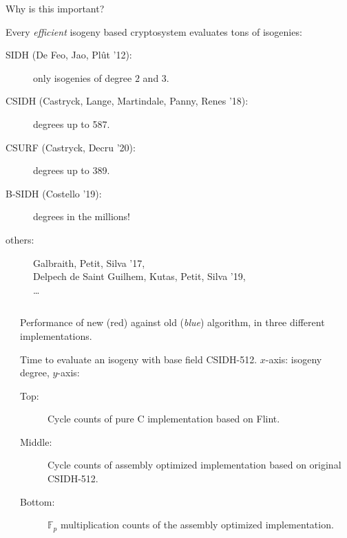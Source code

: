\documentclass[aspectratio=169]{beamer}
\newcommand{\F}{\mathbb{F}}
\begin{document}

\begin{frame}{Why is this important?}
  \large
  
  Every \emph{efficient} isogeny based cryptosystem evaluates tons of
  isogenies:

  \bigskip
  
  \begin{description}
  \item[SIDH (De Feo, Jao, Plût '12):] only isogenies of degree $2$ and $3$.\hfill{}
  \item[CSIDH (Castryck, Lange, Martindale, Panny, Renes '18):] degrees up to 587.\hfill{}
  \item[CSURF (Castryck, Decru '20):] degrees up to 389.\hfill{}
  \item[B-SIDH (Costello '19):] degrees in the millions!\hfill{}
  \item[others:] Galbraith, Petit, Silva '17,\\
    Delpech de Saint Guilhem, Kutas, Petit, Silva
    '19,\hfill{}\\
    \dots
  \end{description}
\end{frame}


\begin{frame}
  \begin{columns}
    \begin{column}{0.5\textwidth}
      \scalebox{0.6}{ }
    \end{column}
    \begin{column}{0.4\textwidth}
      Performance of new (\alert{red}) against old (\emph{blue}) algorithm, in three
      different implementations.

      Time to evaluate an isogeny with base field CSIDH-512. $x$-axis:
      isogeny degree, $y$-axis:

      \begin{description}
      \item[Top:] Cycle counts of pure C implementation based on Flint.
      \item[Middle:] Cycle counts of assembly optimized implementation
        based on original CSIDH-512.
      \item[Bottom:] $\F_p$ multiplication counts of the assembly
        optimized implementation.
      \end{description}
    \end{column}
  \end{columns}
\end{frame}
\end{document}

